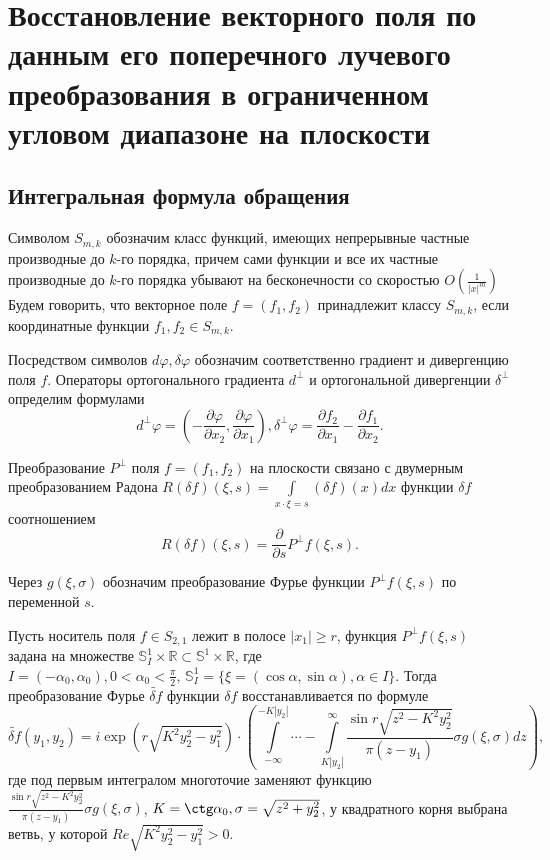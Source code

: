 \chapter{Восстановление векторного поля по данным его поперечного лучевого преобразования в ограниченном угловом диапазоне на плоскости}

\section{Интегральная формула обращения}

Символом $S_{m,k}$ обозначим класс функций, имеющих непрерывные частные производные до $k$-го порядка, причем сами функции и все их частные производные до $k$-го порядка убывают на бесконечности со скоростью $O\left(\frac{1}{|x|^m}\right)$ Будем говорить, что векторное поле $f=(f_1, f_2)$ принадлежит классу $S_{m,k}$, если координатные функции $f_1, f_2 \in S_{m,k}$.

Посредством символов $d\varphi, \delta\varphi$ обозначим соответственно градиент и дивергенцию поля $f$. Операторы ортогонального градиента $d^\bot$ и ортогональной дивергенции $\delta^\bot$ определим формулами
$$d^\bot\varphi=\left(-\frac{\partial\varphi}{\partial x_2}, \frac{\partial\varphi}{\partial x_1}\right), \delta^\bot\varphi=\frac{\partial f_2}{\partial x_1}-\frac{\partial f_1}{\partial x_2}.$$
\begin{lemma}
	Преобразование $P^\bot$ поля $f=(f_1, f_2)$ на плоскости связано с двумерным преобразованием Радона $R(\delta f)(\xi,s)=\int\limits_{x\cdot\xi=s}(\delta f)(x)dx$ функции $\delta f$ соотношением
	$$R(\delta f)(\xi,s)=\frac{\partial}{\partial s}P^\bot f(\xi,s).$$
\end{lemma}
Через $g(\xi,\sigma)$ обозначим преобразование Фурье функции $P^\bot f(\xi,s)$ по переменной $s$.

\begin{theorem}
Пусть носитель поля $f\in S_{2,1}$ лежит в полосе ${|x_1|\geq r}$, функция $P^\bot f(\xi, s)$ задана на множестве $\mathbb S^1_I\times \mathbb R\subset \mathbb S^1\times \mathbb R$, где $I=(-\alpha_0, \alpha_0), 0<\alpha_0<\frac{\pi}{2}, \,\mathbb S^1_I=\{\xi=(\cos \alpha, \sin \alpha), \alpha\in I\} $. Тогда преобразование Фурье $\tilde{\delta f}$ функции $\delta f$ восстанавливается по формуле
$$\tilde{\delta f}(y_1, y_2)=i \exp\left(r \sqrt{K^2y_2^2-y_1^2}\right)\cdot\left(\int\limits_{-\infty}^{-K|y_2|}\cdots -\int\limits_{K|y_2|}^{\infty}\frac{\sin r\sqrt{z^2-K^2y_2^2}}{\pi(z-y_1)}\sigma g(\xi,\sigma)dz\right),$$
где под первым интегралом многоточие заменяют функцию $\frac{\sin r\sqrt{z^2-K^2y_2^2}}{\pi(z-y_1)}\sigma g(\xi,\sigma)$, $K=\ctg \alpha_0, \sigma =\sqrt{z^2+y_2^2}$, у квадратного корня выбрана ветвь, у которой $Re\sqrt{K^2y_2^2-y_1^2}>0$.
\end{theorem}

